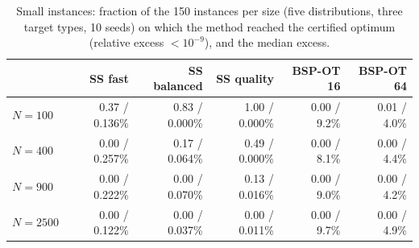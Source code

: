 \begin{table}[tbp]
\centering\small
\caption{Small instances: fraction of the 150 instances per size (five distributions, three target
types, 10 seeds) on which the method reached the certified optimum (relative excess
$<10^{-9}$), and the median excess.}
\label{tab:small}
\setlength{\tabcolsep}{4.5pt}
\begin{tabular}{lrrrrr}
\toprule
 & SS fast & SS balanced & SS quality & BSP-OT 16 & BSP-OT 64 \\
\midrule
$N=100$  & 0.37 / 0.136\% & 0.83 / 0.000\% & 1.00 / 0.000\% & 0.00 / 9.2\% & 0.01 / 4.0\% \\
$N=400$  & 0.00 / 0.257\% & 0.17 / 0.064\% & 0.49 / 0.000\% & 0.00 / 8.1\% & 0.00 / 4.4\% \\
$N=900$  & 0.00 / 0.222\% & 0.00 / 0.070\% & 0.13 / 0.016\% & 0.00 / 9.0\% & 0.00 / 4.2\% \\
$N=2500$ & 0.00 / 0.122\% & 0.00 / 0.037\% & 0.00 / 0.011\% & 0.00 / 9.7\% & 0.00 / 4.9\% \\
\bottomrule
\end{tabular}
\end{table}
